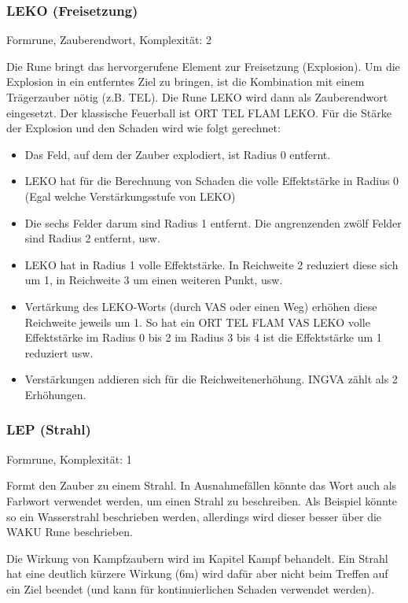 \documentclass{article}
\begin{document}
\subsubsection{LEKO (Freisetzung)}

Formrune, Zauberendwort, Komplexität: 2

Die Rune bringt das hervorgerufene Element zur Freisetzung (Explosion). Um die Explosion in ein entferntes Ziel zu
bringen, ist die Kombination mit einem Trägerzauber nötig (z.B. TEL). Die Rune LEKO wird dann als Zauberendwort
eingesetzt. Der klassische Feuerball ist ORT TEL FLAM LEKO. Für die Stärke der Explosion und den Schaden wird wie
folgt gerechnet:

\begin{itemize}
\item Das Feld, auf dem der Zauber explodiert, ist Radius 0 entfernt.
\item LEKO hat für die Berechnung von Schaden die volle Effektstärke in Radius 0 (Egal welche Verstärkungsstufe von LEKO)
\item Die sechs Felder darum sind Radius 1 entfernt. Die angrenzenden zwölf Felder sind Radius 2 entfernt, usw.
\item LEKO hat in Radius 1 volle Effektstärke. In Reichweite 2 reduziert diese sich um 1, in Reichweite 3 um einen weiteren Punkt, usw.
\item Vertärkung des LEKO-Worts (durch VAS oder einen Weg) erhöhen diese Reichweite jeweils um 1. So hat ein ORT TEL FLAM VAS LEKO volle Effektstärke im Radius 0 bis 2 im Radius 3 bis 4 ist die Effektstärke um 1 reduziert usw.
\item Verstärkungen addieren sich für die Reichweitenerhöhung. INGVA zählt als 2 Erhöhungen.
\end{itemize}

\subsubsection{LEP (Strahl)}

Formrune, Komplexität: 1

Formt den Zauber zu einem Strahl. In Ausnahmefällen könnte das Wort auch als Farbwort verwendet werden, um einen
Strahl zu beschreiben. Als Beispiel könnte so ein Wasserstrahl beschrieben werden, allerdings wird dieser besser über
die WAKU Rune beschrieben.

Die Wirkung von Kampfzaubern wird im Kapitel Kampf behandelt. Ein Strahl hat eine deutlich kürzere Wirkung (6m) wird
dafür aber nicht beim Treffen auf ein Ziel beendet (und kann für kontinuierlichen Schaden verwendet werden).
\end{document}
